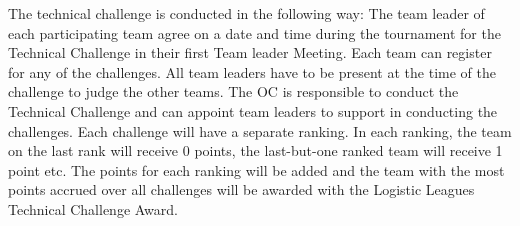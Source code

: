 \documentclass[12pt,twoside]{article}
\begin{document}
  The technical challenge is conducted in the following way: The
  team leader of each participating team agree on a date and time
  during the tournament for the Technical Challenge in their first
  Team leader Meeting. Each team can register for any of the
  challenges. All team leaders have to be present at the time of the
  challenge to judge the other teams. The OC is responsible to conduct
  the Technical Challenge and can appoint team leaders to support in
  conducting the challenges. Each challenge will have a separate
  ranking. In each ranking, the team on the last rank will receive 0
  points, the last-but-one ranked team will receive 1 point etc. The
  points for each ranking will be added and the team with the most
  points accrued over all challenges will be awarded with the
  Logistic Leagues Technical Challenge Award.











\end{document}
